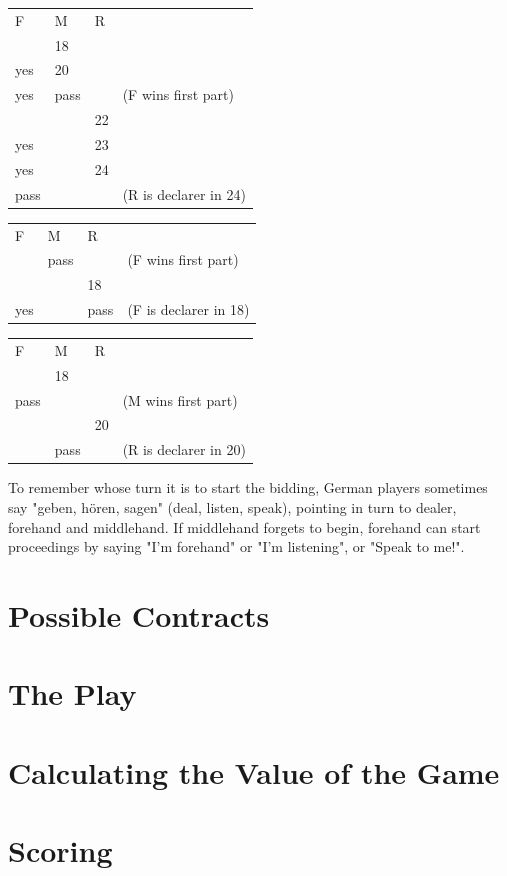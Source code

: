 \documentclass[letter]{article}
\begin{document}
  \begin{minipage}[t][5cm]{0.5\textwidth}
    \centering
    \vspace{0pt}
    \begin{tabular}{l l l l}
         F &    M &  R & \\
       \cmidrule(r){1-3}
           &   18 &    & \\
       yes &   20 &    & \\
       yes & pass &    & (F wins first part) \\
           &      & 22 & \\
       yes &      & 23 & \\
       yes &      & 24 & \\
      pass &      &    & (R is declarer in 24) \\
    \end{tabular}
    \vfill
  \end{minipage}
  \begin{minipage}[t][5cm]{0.5\textwidth}
    \centering
    \vspace{0pt}
    \begin{tabular}{l l l l}
        F &    M &  R & \\
       \cmidrule(r){1-3}
          & pass &    & (F wins first part) \\
          &      & 18 & \\
      yes &      & pass & (F is declarer in 18) \\
    \end{tabular}
    \vfill
    \begin{tabular}{l l l l}
         F &    M &  R & \\
       \cmidrule(r){1-3}
           &   18 &    & \\
      pass &      &    & (M wins first part) \\
           &      & 20 & \\
           & pass &    & (R is declarer in 20) \\
    \end{tabular}
  \end{minipage}

  To remember whose turn it is to start the bidding, German players sometimes
  say "geben, hören, sagen" (deal, listen, speak), pointing in turn to dealer,
  forehand and middlehand. If middlehand forgets to begin, forehand can start
  proceedings by saying "I'm forehand" or "I'm listening", or "Speak to me!".

  \section*{Possible Contracts}

  \section*{The Play}

  \section*{Calculating the Value of the Game}

  \section*{Scoring}
\end{document}
